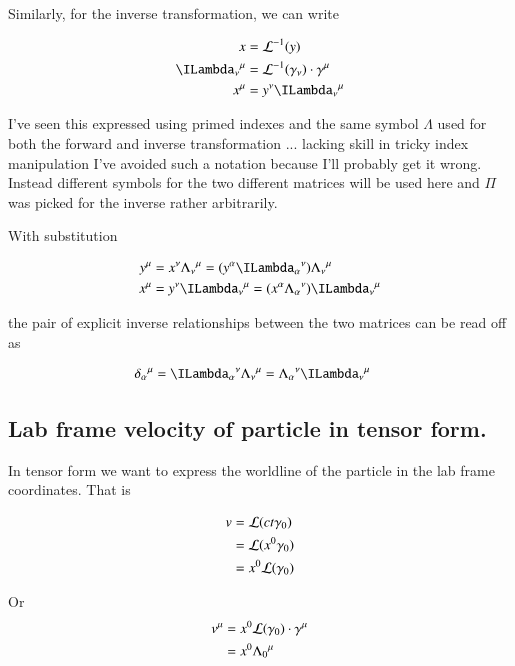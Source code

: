 Similarly, for the inverse transformation, we can write

\begin{align}
x &= \LL^{-1}(y) \\
{\ILambda_\nu}^\mu &= \LL^{-1}(\gamma_\nu) \cdot \gamma^\mu \\
x^\mu &= y^\nu {\ILambda_\nu}^\mu 
\end{align}

I've seen this expressed using primed indexes and the same symbol $\Lambda$ used for both the forward and inverse
transformation ... lacking skill in tricky index manipulation I've avoided such a notation because I'll probably get it
wrong.  Instead different symbols for the two different matrices will be used here and $\Pi$ was picked for the inverse
rather arbitrarily.

With substitution

\begin{align*}
y^\mu &= x^\nu {\Lambda_\nu}^\mu = (y^\alpha {\ILambda_\alpha}^\nu) {\Lambda_\nu}^\mu  \\
x^\mu &= y^\nu {\ILambda_\nu}^\mu = (x^\alpha {\Lambda_\alpha}^\nu) {\ILambda_\nu}^\mu 
\end{align*}

the pair of explicit inverse relationships between the two matrices can be read off as

\begin{align}
{\delta_\alpha}^\mu &= {\ILambda_\alpha}^\nu {\Lambda_\nu}^\mu = {\Lambda_\alpha}^\nu {\ILambda_\nu}^\mu 
\end{align}

\subsection{Lab frame velocity of particle in tensor form. }

In tensor form we want to express the worldline of the particle in the lab frame coordinates.  That is

\begin{align*}
v 
&= \mathcal{L}(c t \gamma_0) \\
&= \mathcal{L}(x^0 \gamma_0) \\
&= x^0 \mathcal{L}(\gamma_0) \\
\end{align*}

Or
\begin{align*}
v^\mu 
&= x^0 \mathcal{L}(\gamma_0) \cdot \gamma^\mu \\
&= x^0 {\Lambda_0}^\mu
\end{align*}

